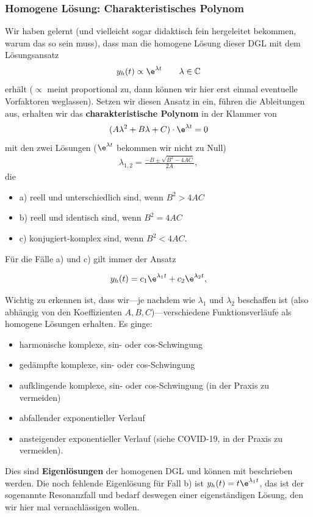 \subsubsection{Homogene Lösung: Charakteristisches Polynom}
%
Wir haben gelernt (und vielleicht sogar didaktisch fein hergeleitet bekommen,
warum das so sein muss), dass man die homogene Lösung dieser DGL mit dem
Lösungsansatz
\begin{equation}
y_h(t) \propto \e^{\lambda t}\qquad \lambda\in\mathbb{C}
\end{equation}
erhält ($\propto$ meint proportional zu, dann können wir hier erst einmal
eventuelle Vorfaktoren weglassen).
%
Setzen wir diesen Ansatz in  ein, führen die Ableitungen
aus, erhalten wir das \textbf{charakteristische Polynom} in der Klammer von
\begin{equation}
(A \lambda^2 + B \lambda + C) \cdot \e^{\lambda t} = 0
\end{equation}
mit den zwei Lösungen ($\e^{\lambda t}$ bekommen wir nicht zu Null)
\begin{align}
\label{eq:A7BEE9E24E_lambdas}
\lambda_{1,2} = \frac{-B \pm \sqrt{B^2-4 A C}}{2 A},
\end{align}
die
\begin{itemize}
  \item a) reell und unterschiedlich sind, wenn $B^2>4 A C$
  \item b) reell und identisch sind, wenn $B^2 = 4 A C$
  \item c) konjugiert-komplex sind, wenn $B^2<4 A C$.
\end{itemize}
%
Für die Fälle a) und c) gilt immer der Ansatz
\begin{mdframed}[backgroundcolor=C3!10]
\begin{align}
\label{eq:A7BEE9E24E_Eigenloesungen}
y_h(t) = c_1 \e^{\lambda_1 t} + c_2 \e^{\lambda_2 t},
\end{align}
\end{mdframed}
%
Wichtig zu erkennen ist, dass wir---je nachdem wie $\lambda_1$ und $\lambda_2$
beschaffen ist (also abhängig von den Koeffizienten $A,B,C$)---verschiedene
Funktionsverläufe als homogene Lösungen erhalten.
Es ginge:
\begin{itemize}
  \item harmonische komplexe, sin- oder cos-Schwingung
  \item gedämpfte komplexe, sin- oder cos-Schwingung
  \item aufklingende komplexe, sin- oder cos-Schwingung (in der Praxis zu vermeiden)
  \item abfallender exponentieller Verlauf
  \item ansteigender exponentieller Verlauf (siehe COVID-19, in der Praxis zu vermeiden).
\end{itemize}
Dies sind \textbf{Eigenlösungen} der homogenen DGL und können mit
 beschrieben werden.
%
Die noch fehlende Eigenlösung für Fall b) ist $y_h(t) = t \e^{\lambda_1 t}$, das
ist der sogenannte Resonanzfall und bedarf deswegen einer eigenständigen Lösung,
den wir hier mal vernachlässigen wollen.

